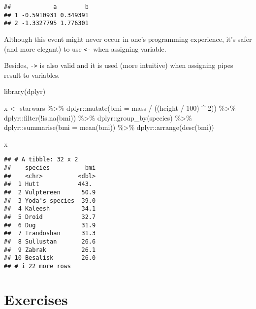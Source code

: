\documentclass[
  oneside]{book}
\newenvironment{Shaded}{\begin{snugshade}}{\end{snugshade}}
\newcommand{\AttributeTok}[1]{\textcolor[rgb]{0.77,0.63,0.00}{#1}}
\newcommand{\DecValTok}[1]{\textcolor[rgb]{0.00,0.00,0.81}{#1}}
\newcommand{\FunctionTok}[1]{\textcolor[rgb]{0.00,0.00,0.00}{#1}}
\newcommand{\NormalTok}[1]{#1}
\newcommand{\OtherTok}[1]{\textcolor[rgb]{0.56,0.35,0.01}{#1}}
\newcommand{\SpecialCharTok}[1]{\textcolor[rgb]{0.00,0.00,0.00}{#1}}
\begin{document}
\begin{verbatim}
##            a        b
## 1 -0.5910931 0.349391
## 2 -1.3327795 1.776301
\end{verbatim}

Although this event might never occur in one's programming experience, it's
safer (and more elegant) to use \texttt{\textless{}-} when assigning variable.

Besides, \texttt{-\textgreater{}} is also valid and it is used (more intuitive) when assigning pipes
result to variables.

\begin{Shaded}
\begin{Highlighting}[]
\FunctionTok{library}\NormalTok{(dplyr)}

\NormalTok{x }\OtherTok{\textless{}{-}}\NormalTok{ starwars }\SpecialCharTok{\%\textgreater{}\%}
\NormalTok{  dplyr}\SpecialCharTok{::}\FunctionTok{mutate}\NormalTok{(}\AttributeTok{bmi =}\NormalTok{ mass }\SpecialCharTok{/}\NormalTok{ ((height }\SpecialCharTok{/} \DecValTok{100}\NormalTok{) }\SpecialCharTok{\^{}} \DecValTok{2}\NormalTok{)) }\SpecialCharTok{\%\textgreater{}\%}
\NormalTok{  dplyr}\SpecialCharTok{::}\FunctionTok{filter}\NormalTok{(}\SpecialCharTok{!}\FunctionTok{is.na}\NormalTok{(bmi)) }\SpecialCharTok{\%\textgreater{}\%}
\NormalTok{  dplyr}\SpecialCharTok{::}\FunctionTok{group\_by}\NormalTok{(species) }\SpecialCharTok{\%\textgreater{}\%}
\NormalTok{  dplyr}\SpecialCharTok{::}\FunctionTok{summarise}\NormalTok{(}\AttributeTok{bmi =} \FunctionTok{mean}\NormalTok{(bmi)) }\SpecialCharTok{\%\textgreater{}\%}
\NormalTok{  dplyr}\SpecialCharTok{::}\FunctionTok{arrange}\NormalTok{(}\FunctionTok{desc}\NormalTok{(bmi))}

\NormalTok{x}
\end{Highlighting}
\end{Shaded}

\begin{verbatim}
## # A tibble: 32 x 2
##    species          bmi
##    <chr>          <dbl>
##  1 Hutt           443. 
##  2 Vulptereen      50.9
##  3 Yoda's species  39.0
##  4 Kaleesh         34.1
##  5 Droid           32.7
##  6 Dug             31.9
##  7 Trandoshan      31.3
##  8 Sullustan       26.6
##  9 Zabrak          26.1
## 10 Besalisk        26.0
## # i 22 more rows
\end{verbatim}

\hypertarget{exercises}{%
\section{Exercises}\label{exercises}}
\end{document}
